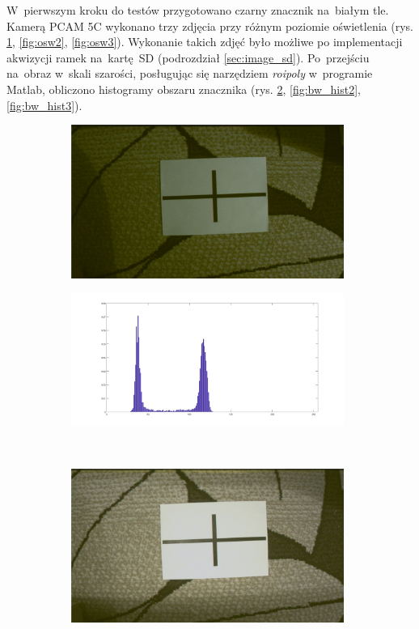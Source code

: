 W~pierwszym kroku do testów przygotowano czarny znacznik na~białym tle. 
Kamerą PCAM 5C wykonano trzy zdjęcia przy różnym poziomie oświetlenia (rys. \ref{fig:osw1}, \ref{fig:osw2}, \ref{fig:osw3}). 
Wykonanie takich zdjęć było możliwe po implementacji akwizycji ramek na~kartę~SD  (podrozdział \ref{sec:image_sd}). 
Po~przejściu na~obraz w~skali szarości, posługując się narzędziem \textit{roipoly} w~programie Matlab, obliczono histogramy obszaru znacznika (rys. \ref{fig:bw_hist1}, \ref{fig:bw_hist2}, \ref{fig:bw_hist3}).\\
\begin{figure}
	\centering
	\begin{subfigure}{0.4\textwidth}
		\centering
		\includegraphics[width=0.98\textwidth]{rgb_ciemny.jpg}
		\caption{}
		\label{fig:osw1}
	\end{subfigure}%
	\begin{subfigure}{0.55\textwidth}
		\centering
		\includegraphics[width=0.98\textwidth]{bw_hist1.jpg}
		\caption{}
		\label{fig:bw_hist1}
	\end{subfigure}\\
	\begin{subfigure}{0.4\textwidth}
		\centering
		\includegraphics[width=0.98\textwidth]{rgb_sredni.jpg}

\end{subfigure}
\end{figure}
